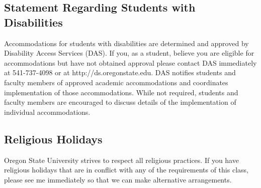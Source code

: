 \documentclass[]{article}
\begin{document}
\subsection*{Statement Regarding Students with Disabilities}
Accommodations for students with disabilities are determined and approved by Disability Access Services (DAS). If you, as a student, believe you are eligible for accommodations but have not obtained approval please contact DAS immediately at 541-737-4098 or at http://ds.oregonstate.edu. DAS notifies students and faculty members of approved academic accommodations and coordinates implementation of those accommodations. While not required, students and faculty members are encouraged to discuss details of the implementation of individual accommodations.

\subsection*{Religious Holidays}
Oregon State University strives to respect all religious practices.  If you have religious holidays that are in conflict with any of the requirements of this class, please see me immediately so that we can make alternative arrangements.
\end{document}
